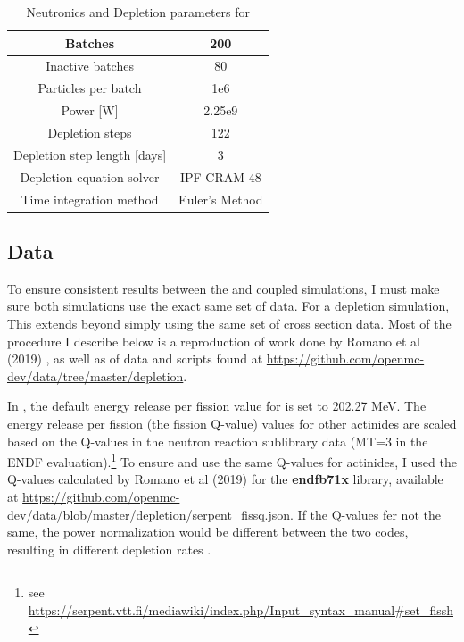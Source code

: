 \begin{table}[htpb] 
    \centering 
    \caption{Neutronics and Depletion parameters for \SaltProc}
    \label{tab:saltproc-params}
    \begin{tabular}{|c|c|} 
        \hline
        Batches & 200 \\
        \hline
        Inactive batches & 80 \\
        \hline
        Particles per batch & 1e6 \\
        \hline
        Power [W] & 2.25e9 \\
        \hline
        Depletion steps & 122 \\
        \hline
        Depletion step length [days] & 3 \\
        \hline
        Depletion equation solver & IPF CRAM 48 \\
        \hline
        Time integration method & Euler's Method \\
        \hline
    \end{tabular}
\end{table}

\subsection{Data}
\label{sub:results-xs-data}

To ensure consistent results between the \OpenMC and \SerpentTWO coupled
simulations, I must make sure both simulations use the exact same set of data.
For a depletion simulation, This extends beyond simply using the same set of
cross section data. Most of the procedure I describe below is a reproduction of
work done by Romano et al (2019) \cite{romano_depletion_2021}, as well as of
data and scripts found at \url{https://github.com/openmc-dev/data/tree/master/depletion}.

In \SerpentTWO, the default energy release per fission value for 
is set to 202.27 MeV. The energy release per fission (the fission Q-value) values for other actinides
are scaled based on the Q-values in the neutron reaction sublibrary data (MT=3 in the
ENDF evaluation).\footnote{see \url{https://serpent.vtt.fi/mediawiki/index.php/Input_syntax_manual\#set_fissh}}
To ensure \OpenMC and \SerpentTWO use the same Q-values for actinides, 
I used the Q-values calculated by Romano et al (2019) for the {\bf endfb71x} library,
available at \url{https://github.com/openmc-dev/data/blob/master/depletion/serpent_fissq.json}.
If the Q-values fer not the same, the power normalization would be different
between the two codes,
resulting in different depletion rates \cite{romano_depletion_2021}.

